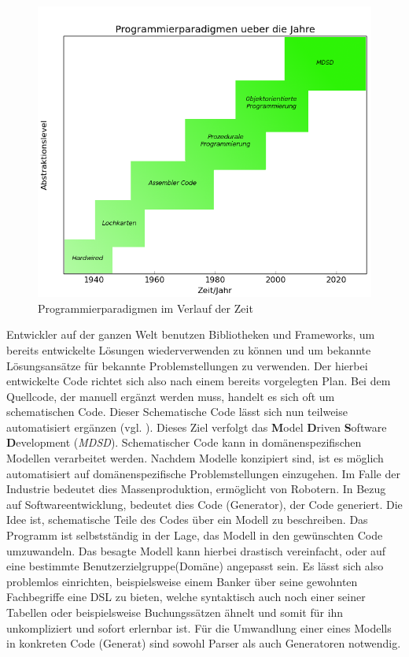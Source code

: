 \begin{figure}[h]
	\begin{center}
		\includegraphics[width = \textwidth]{Bilder/paradigmsInTime(matplotlib).png}
		\caption{Programmierparadigmen im Verlauf der Zeit}
		\label{paradigmnsintime}
	\end{center}
\end{figure}Entwickler auf der ganzen Welt benutzen Bibliotheken und Frameworks, um bereits entwickelte Lösungen wiederverwenden zu können und um bekannte Lösungsansätze für bekannte Problemstellungen zu verwenden. Der hierbei entwickelte Code richtet sich also nach einem bereits vorgelegten Plan. Bei dem Quellcode, der manuell ergänzt werden muss, handelt es sich oft um schematischen Code. Dieser Schematische Code lässt sich nun teilweise automatisiert ergänzen (vgl. ). Dieses Ziel verfolgt das \textbf{M}odel \textbf{D}riven \textbf{S}oftware \textbf{D}evelopment (\textit{MDSD}). Schematischer Code kann in domänenspezifischen Modellen verarbeitet werden. Nachdem Modelle konzipiert sind, ist es möglich automatisiert auf domänenspezifische Problemstellungen einzugehen. Im Falle der Industrie bedeutet dies Massenproduktion, ermöglicht von Robotern. In Bezug auf Softwareentwicklung, bedeutet dies Code (Generator), der Code generiert. Die Idee ist, schematische Teile des Codes über ein Modell zu beschreiben. Das Programm ist selbstständig in der Lage, das Modell in den gewünschten Code umzuwandeln. Das besagte Modell kann hierbei drastisch vereinfacht, oder auf eine bestimmte Benutzerzielgruppe(Domäne) angepasst sein. Es lässt sich also problemlos einrichten, beispielsweise einem Banker über seine gewohnten Fachbegriffe eine DSL zu bieten, welche syntaktisch auch noch einer seiner Tabellen oder beispielsweise Buchungssätzen ähnelt und somit für ihn unkompliziert und sofort erlernbar ist. Für die Umwandlung einer eines Modells in konkreten Code (Generat) sind sowohl Parser als auch Generatoren notwendig.
